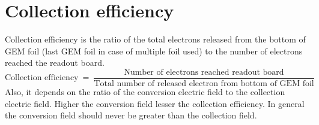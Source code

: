 \section{Collection efficiency} %
\label{sec:collection_efficiency}
Collection efficiency is the ratio of the total electrons released from the bottom of GEM foil (last GEM foil in case of multiple foil used) to the number of electrons reached the readout board. 
\begin{equation}
	\text{Collection efficiency}~=~\frac{\text{Number of electrons reached readout board}}{\text{Total number of released electron from bottom of GEM foil}}
\end{equation}
Also, it depends on the ratio of the conversion electric field to the collection electric field. Higher the conversion field lesser the collection efficiency. In general the conversion field should never be greater than the collection field. 


